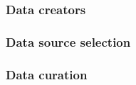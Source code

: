 \documentclass{article}
\begin{document}

\subsubsection{Data creators}


\subsubsection{Data source selection}


\subsubsection{Data curation}

\end{document}
